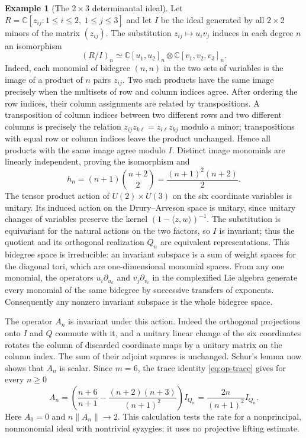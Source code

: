 \documentclass[11pt,reqno]{amsart}
\numberwithin{equation}{section}
\theoremstyle{definition}
\newtheorem{example}[theorem]{Example}
\theoremstyle{remark}
\newcommand{\C}{\mathbb C}
\begin{document}
\begin{example}[The $2\times3$ determinantal ideal]\label{ext:segre-defect}
Let $R=\C[z_{ij}:1\leq i\leq2,\ 1\leq j\leq3]$ and let $I$ be the
ideal generated by all $2\times2$ minors of the matrix $(z_{ij})$.
The substitution $z_{ij}\mapsto u_i v_j$ induces in each degree $n$
an isomorphism
\[
 (R/I)_n\simeq \C[u_1,u_2]_n\otimes\C[v_1,v_2,v_3]_n.
\]
Indeed, each monomial of bidegree $(n,n)$ in the two sets of variables
is the image of a product of $n$ pairs $z_{ij}$. Two such products have
the same image precisely when the multisets of row and column indices
agree. After ordering the row indices, their column assignments are
related by transpositions. A transposition of column indices between
two different rows and two different columns is precisely the relation
$z_{ij}z_{k\ell}=z_{i\ell}z_{kj}$ modulo a minor; transpositions
with equal row or column indices leave the product unchanged. Hence
all products with the same image agree modulo $I$. Distinct image
monomials are linearly independent, proving the isomorphism and
\[
 h_n=(n+1)\binom{n+2}{2}=\frac{(n+1)^2(n+2)}2.
\]
The tensor product action of $U(2)\times U(3)$ on the six coordinate
variables is unitary. Its induced action on the Drury--Arveson space
is unitary, since unitary changes of variables preserve the kernel
$(1-\langle z,w\rangle)^{-1}$. The substitution is equivariant
for the natural actions on the two factors, so $I$ is invariant;
thus the quotient and its orthogonal realization $Q_n$ are equivalent
representations. This bidegree space is irreducible: an invariant
subspace is a sum of weight spaces for the diagonal tori, which are
one-dimensional monomial spaces. From any one monomial, the operators
$u_i\partial_{u_k}$ and $v_j\partial_{v_\ell}$ in the complexified
Lie algebra generate every monomial of the same bidegree by successive
transfers of exponents. Consequently any nonzero invariant subspace
is the whole bidegree space.

The operator $A_n$ is invariant under this action. Indeed the
orthogonal projections onto $I$ and $Q$ commute with it, and a unitary
linear change of the six coordinates rotates the column of discarded
coordinate maps by a unitary matrix on the column index. The sum of
their adjoint squares is unchanged. Schur's lemma now shows that
$A_n$ is scalar. Since $m=6$, the trace identity
\eqref{eq:op-trace} gives for every $n\geq0$
\begin{equation}\label{eq:segre-defect}
 A_n=\left(\frac{n+6}{n+1}
       -\frac{(n+2)(n+3)}{(n+1)^2}\right)I_{Q_n}
     =\frac{2n}{(n+1)^2}I_{Q_n}.
\end{equation}
Here $A_0=0$ and $n\|A_n\|\to2$. This calculation tests the rate for
a nonprincipal, nonmonomial ideal with nontrivial syzygies; it uses
no projective lifting estimate.
\end{example}
\end{document}
